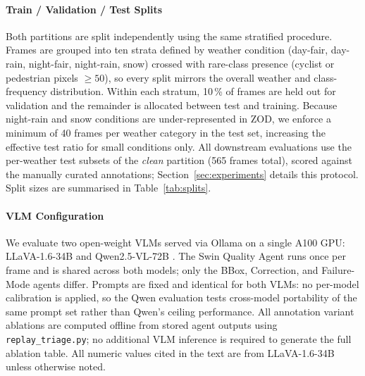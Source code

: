 \documentclass[conference]{IEEEtran}
\begin{document}
\paragraph{Train / Validation / Test Splits}
Both partitions are split independently using the same stratified procedure.
Frames are grouped into ten strata defined by weather condition (day-fair, day-rain, night-fair, night-rain, snow) crossed with rare-class presence (cyclist or pedestrian pixels $\geq 50$), so every split mirrors the overall weather and class-frequency distribution.
Within each stratum, 10\,\% of frames are held out for validation and the remainder is allocated between test and training.
Because night-rain and snow conditions are under-represented in ZOD, we enforce a minimum of 40 frames per weather category in the test set, increasing the effective test ratio for small conditions only.
All downstream evaluations use the per-weather test subsets of the \emph{clean} partition (565 frames total), scored against the manually curated annotations; Section~\ref{sec:experiments} details this protocol.
Split sizes are summarised in Table~\ref{tab:splits}.



\paragraph{VLM Configuration}
We evaluate two open-weight VLMs served via Ollama on a single A100 GPU: LLaVA-1.6-34B \cite{liu2024llava} and Qwen2.5-VL-72B \cite{bai2025qwen25vl}.
The Swin Quality Agent runs once per frame and is shared across both models; only the BBox, Correction, and Failure-Mode agents differ.
Prompts are fixed and identical for both VLMs: no per-model calibration is applied, so the Qwen evaluation tests cross-model portability of the same prompt set rather than Qwen's ceiling performance.
All annotation variant ablations are computed offline from stored agent outputs using \texttt{replay\_triage.py}; no additional VLM inference is required to generate the full ablation table.
All numeric values cited in the text are from LLaVA-1.6-34B unless otherwise noted.
\end{document}
